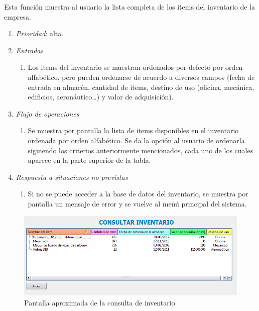 

 \label{fun:ConsulInv}
	Esta función muestra al usuario la lista completa de los items del inventario de la empresa.
		
	\begin{enumerate}
		\item \textit{Prioridad}: alta.
		\item \textit{Entradas}
		\begin{enumerate}
			\item Los items del inventario se muestran ordenados por defecto por orden alfabético, pero pueden ordenarse de acuerdo a diversos campos (fecha de entrada en almacén, cantidad de items, destino de uso (oficina, mecánica, edificios, aeronáutico\ldots) y valor de adquisición).
		\end{enumerate}
		\item \textit{Flujo de operaciones}
		\begin{enumerate}
			\item Se muestra por pantalla la lista de items disponibles en el inventario ordenada por orden alfabético. Se da la opción al usuario de ordenarla siguiendo los criterios anteriormente mencionados, cada uno de los cuales aparece en la parte superior de la tabla.
		\end{enumerate}
		\item \textit{Respuesta a situaciones no previstas}
		\begin{enumerate}
			\item Si no se puede acceder a la base de datos del inventario, se muestra por pantalla un mensaje de error y se vuelve al menú principal del sistema.
		\end{enumerate}
	\end{enumerate}
	
\begin{figure}[ht]\centering
\includegraphics[scale=.6]{imagenes/consultarInventarioImagen.png}
\caption{Pantalla aproximada de la consulta de inventario}
\end{figure}